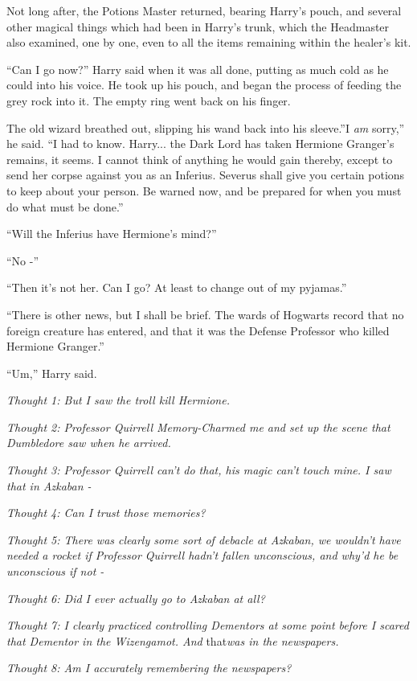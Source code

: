 Not long after, the Potions Master returned, bearing Harry's pouch, and
several other magical things which had been in Harry's trunk, which the
Headmaster also examined, one by one, even to all the items remaining
within the healer's kit.

``Can I go now?'' Harry said when it was all done, putting as much cold
as he could into his voice. He took up his pouch, and began the process
of feeding the grey rock into it. The empty ring went back on his
finger.

The old wizard breathed out, slipping his wand back into his sleeve.''I
\emph{am} sorry,'' he said. ``I had to know. Harry... the Dark Lord
has taken Hermione Granger's remains, it seems. I cannot think of
anything he would gain thereby, except to send her corpse against you as
an Inferius. Severus shall give you certain potions to keep about your
person. Be warned now, and be prepared for when you must do what must be
done.''

``Will the Inferius have Hermione's mind?''

``No -''

``Then it's not her. Can I go? At least to change out of my pyjamas.''

``There is other news, but I shall be brief. The wards of Hogwarts
record that no foreign creature has entered, and that it was the Defense
Professor who killed Hermione Granger.''

``Um,'' Harry said.

\emph{Thought 1: But I saw the troll kill Hermione.}

\emph{Thought 2: Professor Quirrell Memory-Charmed me and set up the
scene that Dumbledore saw when he arrived.}

\emph{Thought 3: Professor Quirrell can't do that, his magic can't touch
mine. I saw that in Azkaban -}

\emph{Thought 4: Can I trust those memories?}

\emph{Thought 5: There was clearly some sort of debacle at Azkaban, we
wouldn't have needed a rocket if Professor Quirrell hadn't fallen
unconscious, and why'd he be unconscious if not -}

\emph{Thought 6: Did I ever actually go to Azkaban at all?}

\emph{Thought 7: I clearly practiced controlling Dementors at some point
before I scared that Dementor in the Wizengamot. And} that\emph{was in
the newspapers.}

\emph{Thought 8: Am I accurately remembering the newspapers?}


